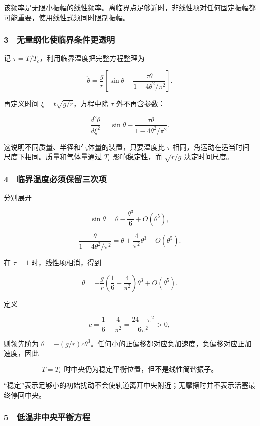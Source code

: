 \documentclass[12pt,a4paper,fontset=fandol]{ctexart}
\begin{document}
该频率是无限小振幅的线性频率。离临界点足够近时，非线性项对任何固定振幅都可能重要，使用线性式须同时限制振幅。

\subsubsection{3　无量纲化使临界条件更透明}\label{ux65e0ux91cfux7eb2ux5316ux4f7fux4e34ux754cux6761ux4ef6ux66f4ux900fux660e}

记 \(\tau=T/T_c\)，利用临界温度把完整方程整理为

\[\boxed{\ddot\theta=\frac gr
\left[\sin\theta-\frac{\tau\theta}{1-4\theta^2/\pi^2}\right].}\]

再定义时间 \(\xi=t\sqrt{g/r}\)，方程中除 \(\tau\) 外不再含参数：

\[\frac{d^2\theta}{d\xi^2}
=\sin\theta-\frac{\tau\theta}{1-4\theta^2/\pi^2}.\]

这说明不同质量、半径和气体量的装置，只要温度比 \(\tau\)
相同，角运动在适当时间尺度下相同。质量和气体量通过 \(T_c\)
影响稳定性，而 \(\sqrt{r/g}\) 决定时间尺度。

\subsubsection{4　临界温度必须保留三次项}\label{ux4e34ux754cux6e29ux5ea6ux5fc5ux987bux4fddux7559ux4e09ux6b21ux9879}

分别展开

\[\sin\theta=\theta-\frac{\theta^3}{6}+O(\theta^5),\]

\[\frac{\theta}{1-4\theta^2/\pi^2}
=\theta+\frac4{\pi^2}\theta^3+O(\theta^5).\]

在 \(\tau=1\) 时，线性项相消，得到

\[\ddot\theta=-\frac gr
\left(\frac16+\frac4{\pi^2}\right)\theta^3+O(\theta^5).\]

定义

\[c=\frac16+\frac4{\pi^2}=\frac{24+\pi^2}{6\pi^2}>0,\]

则领先阶为
\(\ddot\theta=-(g/r)c\theta^3\)。任何小的正偏移都对应负加速度，负偏移对应正加速度，因此

\[\boxed{T=T_c\text{ 时中央仍为稳定平衡位置，但不是线性简谐振子。}}\]

``稳定''表示足够小的初始扰动不会使轨道离开中央附近；无摩擦时并不表示活塞最终停回中央。

\subsubsection{5　低温非中央平衡方程}\label{ux4f4eux6e29ux975eux4e2dux592eux5e73ux8861ux65b9ux7a0b}
\end{document}
